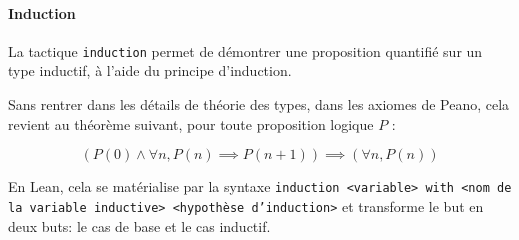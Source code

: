 \paragraph{Induction}

La tactique \texttt{induction} permet de démontrer une proposition quantifié sur un type inductif, à l'aide du principe d'induction.

Sans rentrer dans les détails de théorie des types, dans les axiomes de Peano, cela revient au théorème suivant, pour toute proposition logique $P$ :

\begin{equation*}
\left(P(0) \land \forall n, P(n) \implies P(n + 1)\right) \implies (\forall n, P(n))
\end{equation*}

En Lean, cela se matérialise par la syntaxe \texttt{induction <variable> with <nom de la variable inductive> <hypothèse d'induction>} et transforme le but en deux buts: le cas de base et le cas inductif.

